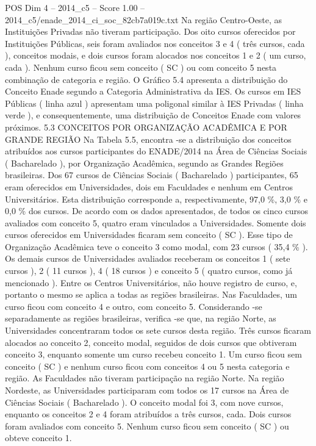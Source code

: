 \begin{textsample}{POS Dim 4 – 2014\_c5 – Score 1.00 – 2014\_c5/enade\_2014\_ci\_soc\_82cb7a019c.txt}
Na região Centro-Oeste, as Instituições Privadas não tiveram participação.
Dos oito cursos oferecidos por Instituições Públicas, seis foram avaliados nos conceitos 3 e 4 ( três cursos, cada ), conceitos modais, e dois cursos foram alocados nos conceitos 1 e 2 ( um curso, cada ).
Nenhum curso ficou sem conceito ( SC ) ou com conceito 5 nesta combinação de categoria e região.
O Gráfico 5.4 apresenta a distribuição do Conceito Enade segundo a Categoria Administrativa da IES.
Os cursos em IES Públicas ( linha azul ) apresentam uma poligonal similar à IES Privadas ( linha verde ), e consequentemente, uma distribuição de Conceitos Enade com valores próximos. 5.3 CONCEITOS POR ORGANIZAÇÃO ACADÊMICA E POR GRANDE REGIÃO Na Tabela 5.5, encontra -se a distribuição dos conceitos atribuídos aos cursos participantes do ENADE/2014 na Área de Ciências Sociais ( Bacharelado ), por Organização Acadêmica, segundo as Grandes Regiões brasileiras.
Dos 67 cursos de Ciências Sociais ( Bacharelado ) participantes, 65 eram oferecidos em Universidades, dois em Faculdades e nenhum em Centros Universitários.
Esta distribuição corresponde a, respectivamente, 97,0 \%, 3,0 \% e 0,0 \% dos cursos.
De acordo com os dados apresentados, de todos os cinco cursos avaliados com conceito 5, quatro eram vinculados a Universidades.
Somente dois cursos oferecidos em Universidades ficaram sem conceito ( SC ).
Esse tipo de Organização Acadêmica teve o conceito 3 como modal, com 23 cursos ( 35,4 \% ).
Os demais cursos de Universidades avaliados receberam os conceitos 1 ( sete cursos ), 2 ( 11 cursos ), 4 ( 18 cursos ) e conceito 5 ( quatro cursos, como já mencionado ).
Entre os Centros Universitários, não houve registro de curso, e, portanto o mesmo se aplica a todas as regiões brasileiras.
Nas Faculdades, um curso ficou com conceito 4 e outro, com conceito 5.
Considerando -se separadamente as regiões brasileiras, verifica -se que, na região Norte, as Universidades concentraram todos os sete cursos desta região.
Três cursos ficaram alocados ao conceito 2, conceito modal, seguidos de dois cursos que obtiveram conceito 3, enquanto somente um curso recebeu conceito 1.
Um curso ficou sem conceito ( SC ) e nenhum curso ficou com conceitos 4 ou 5 nesta categoria e região.
As Faculdades não tiveram participação na região Norte.
Na região Nordeste, as Universidades participaram com todos os 17 cursos na Área de Ciências Sociais ( Bacharelado ).
O conceito modal foi 3, com nove cursos, enquanto os conceitos 2 e 4 foram atribuídos a três cursos, cada.
Dois cursos foram avaliados com conceito 5.
Nenhum curso ficou sem conceito ( SC ) ou obteve conceito 1.

\end{textsample}
